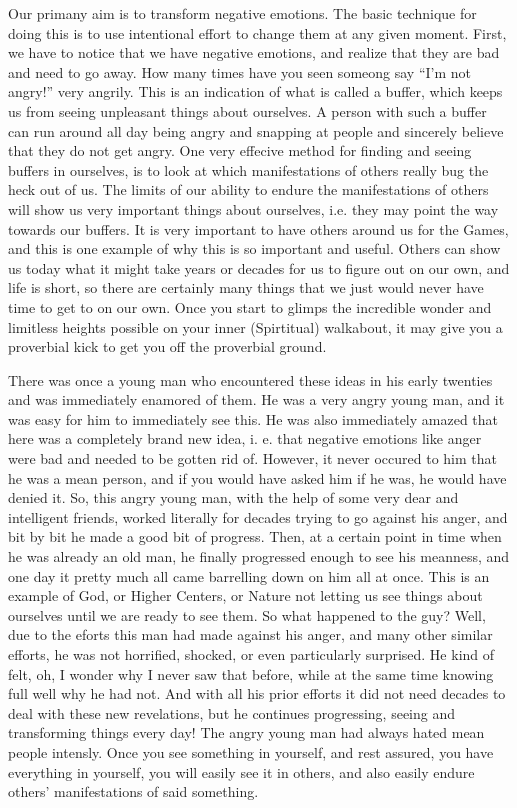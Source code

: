 \documentclass[12pt,letterpaper]{book}
\begin{document}
Our primany aim is to transform negative emotions. The basic technique for doing this is to use intentional effort to change them at any given moment. First, we have to notice that we have negative emotions, and realize that they are bad and need to go away. How many times have you seen someong say ``I'm not angry!'' very angrily. This is an indication of what is called a buffer, which keeps us from seeing unpleasant things about ourselves. A person with such a buffer can run around all day being angry and snapping at people and sincerely believe that they do not get angry. One very effecive method for finding and seeing buffers in ourselves, is to look at which manifestations of others really bug the heck out of us. The limits of our ability to endure the manifestations of others will show us very important things about ourselves, i.e. they may point the way towards our buffers. It is very important to have others around us for the Games, and this is one example of why this is so important and useful. Others can show us today what it might take years or decades for us to figure out on our own, and life is short, so there are certainly many things that we just would never have time to get to on our own. Once you start to glimps the incredible wonder and limitless heights possible on your inner (Spirtitual) walkabout, it may give you a proverbial kick to get you off the proverbial ground.

There was once a young man who encountered these ideas in his early twenties and was immediately enamored of them. He was a very angry young man, and it was easy for him to immediately see this. He was also immediately amazed that here was a completely brand new idea, i. e. that negative emotions like anger were bad and needed to be gotten rid of. However, it never occured to him that he was a mean person, and if you would have asked him if he was, he would have denied it. So, this angry young man, with the help of some very dear and intelligent friends, worked literally for decades trying to go against his anger, and bit by bit he made a good bit of progress. Then, at a certain point in time when he was already an old man, he finally progressed enough to see his meanness, and one day it pretty much all came barrelling down on him all at once. This is an example of God, or Higher Centers, or Nature not letting us see things about ourselves until we are ready to see them. So what happened to the guy? Well, due to the eforts this man had made against his anger, and many other similar efforts, he was not horrified, shocked, or even particularly surprised. He kind of felt, oh, I wonder why I never saw that before, while at the same time knowing full well why he had not. And with all his prior efforts it did not need decades to deal with these new revelations, but he continues progressing, seeing and transforming things every day! The angry young man had always hated mean people intensly. Once you see something in yourself, and rest assured, you have everything in yourself, you will easily see it in others, and also easily endure others' manifestations of said something.
\end{document}
